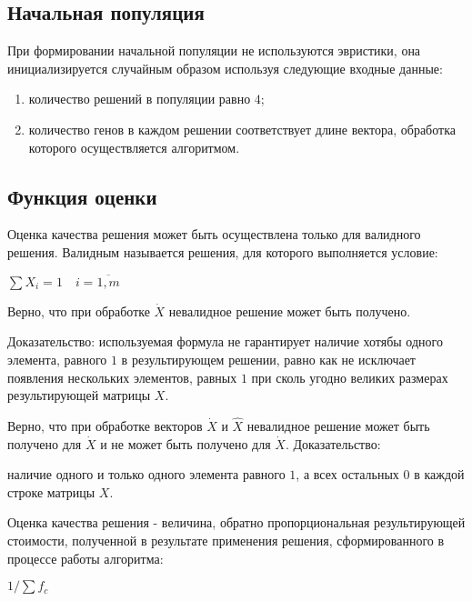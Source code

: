 \subsection*{Начальная популяция}
При формировании начальной популяции не используются эвристики, она инициализируется случайным образом используя следующие входные данные:
\begin{enumerate}
  \item количество решений в популяции равно $4$;
  \item количество генов в каждом решении соответствует длине вектора, обработка которого осуществляется алгоритмом.
\end{enumerate}

\subsection*{Функция оценки}
Оценка качества решения может быть осуществлена только для валидного решения. Валидным называется решения, для которого выполняется условие:
\begin{center}
  $\displaystyle \sum X_{i} = 1 \quad i=\overline{1, m}$
\end{center}

Верно, что при обработке $\dot{X}$ невалидное решение может быть получено.

Доказательство: используемая формула не гарантирует наличие хотябы одного элемента, равного $1$ в результирующем решении, равно как не исключает появления нескольких элементов, равных $1$ при сколь угодно великих размерах результирующей матрицы $X$.


Верно, что при обработке векторов $\dot{X}$ и $\hat{X}$ невалидное решение может быть получено для $\dot{X}$ и не может быть получено для $\dot{X}$. Доказательство:

наличие одного и только одного элемента равного $1$, а всех остальных $0$ в каждой строке матрицы $X$.

Оценка качества решения - величина, обратно пропорциональная результирующей стоимости, полученной в результате применения решения, сформированного в процессе работы алгоритма:
\begin{center}
  $\displaystyle 1 / \sum f_{c}$
\end{center}


